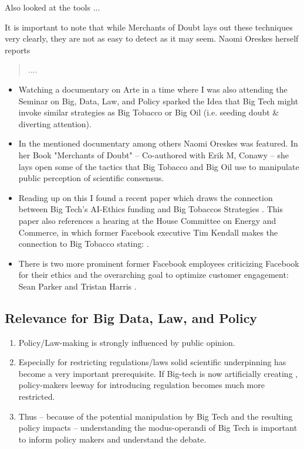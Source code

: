 Also \cite{abdalla_grey_2021} looked at the tools ...

It is important to note that while Merchants of Doubt lays out these techniques very clearly, they are not as easy to detect as it may seem. Naomi Oreskes herself reports \begin{quote}
....
\end{quote} \citep{oreskes_merchants_2010} 

\newpage

\begin{itemize}
    \item Watching a documentary on Arte \citep{cuveillier_forschung_2020} in a time where I was also attending the Seminar on Big, Data, Law, and Policy sparked the Idea that Big Tech might invoke similar strategies as Big Tobacco or Big Oil (i.e. seeding doubt \& diverting attention).
    \item In the mentioned documentary among others Naomi Oreskes was featured. In her Book "Merchants of Doubt" \citep{oreskes_merchants_2010} -- Co-authored with Erik M, Conawy -- she lays open some of the tactics that Big Tobacco and Big Oil use to manipulate public perception of scientific consensus.
    \item Reading up on this I found a recent paper which draws the connection between Big Tech's AI-Ethics funding and Big Tobaccos Strategies  \citep{abdalla_grey_2021}. This paper also references a hearing at the House Committee on Energy and Commerce, in which former Facebook executive Tim Kendall makes the connection to Big Tobacco stating:  \citep{kendall_house_2020}.
    \item There is two more prominent former Facebook employees criticizing Facebook for their ethics and the overarching goal to optimize customer engagement: Sean Parker \citep{allen_sean_2017} and Tristan Harris \citep{metz_smartphones_2017}.
\end{itemize}

\subsection{Relevance for Big Data, Law, and Policy}
\begin{enumerate}
    \item Policy/Law-making is strongly influenced by public opinion.
    \item Especially for restricting regulations/laws solid scientific underpinning has become a very important prerequisite. If Big-tech is now artificially creating , policy-makers leeway for introducing regulation becomes much more restricted.
    \item Thus -- because of the potential manipulation by Big Tech and the resulting policy impacts -- understanding the modus-operandi of Big Tech is important to inform policy makers and understand the debate.
\end{enumerate}


